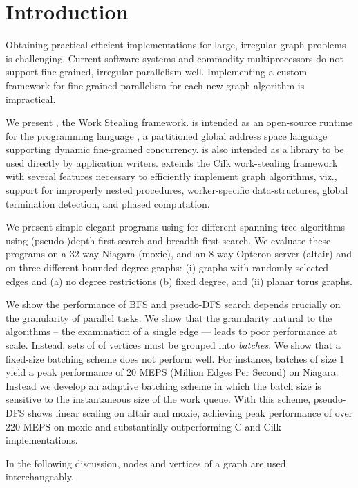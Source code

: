 
\section{Introduction}
\label{s:intr}\label{sec:intro}

Obtaining practical efficient implementations for large, irregular
graph problems is challenging. Current software systems and commodity
multiprocessors do not support fine-grained, irregular parallelism
well. Implementing a custom framework for fine-grained parallelism for
each new graph algorithm is impractical.

We present \XWS{}, the \Xten{} Work Stealing framework.
\XWS{} is intended as an open-source runtime for the programming
language \Xten{}, a partitioned global address space language
supporting dynamic fine-grained concurrency.  \XWS{} is also intended
as a library to be used directly by application writers. \XWS{}
extends the Cilk work-stealing framework with several features
necessary to efficiently implement graph algorithms, viz., support for
improperly nested procedures, worker-specific data-structures, global
termination detection, and phased computation.

We present simple elegant programs using \XWS{} for different spanning
tree algorithms using (pseudo-)depth-first search and breadth-first
search.  We evaluate these programs on a 32-way Niagara (moxie), and
an 8-way Opteron server (altair) and on three different bounded-degree
graphs: (i) graphs with randomly selected edges and (a) no degree
restrictions (b) fixed degree, and (ii) planar torus graphs.

We show the performance of BFS and pseudo-DFS search depends crucially
on the granularity of parallel tasks. We show that the granularity
natural to the algorithms -- the examination of a single edge ---
leads to poor performance at scale. Instead, sets of of vertices must
be grouped into {\em batches}. We show that a fixed-size batching
scheme does not perform well. For instance, batches of size $1$ yield
a peak performance of 20 MEPS (Million Edges Per Second) on Niagara.
Instead we develop an adaptive batching scheme in which the batch
size is sensitive to the instantaneous size of the work queue.  With
this scheme, pseudo-DFS shows linear scaling on altair and moxie,
achieving peak performance of over 220 MEPS on moxie and substantially
outperforming C and Cilk implementations.

In the following discussion, nodes and vertices of a graph are used interchangeably.

